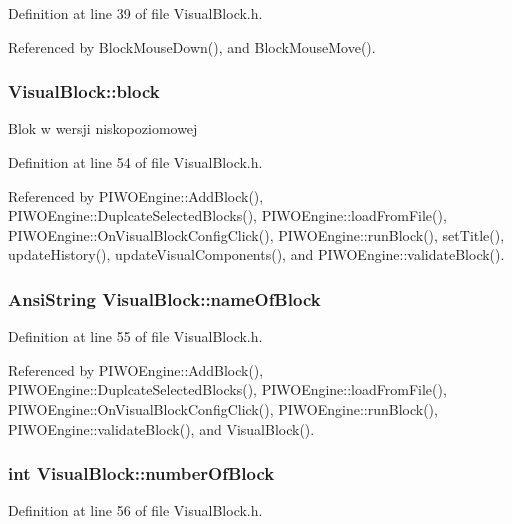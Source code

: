 Definition at line 39 of file VisualBlock.h.

Referenced by BlockMouseDown(), and BlockMouseMove().\hypertarget{classVisualBlock_76bfcfa68286004c352c4736635be0cb}{
\subsubsection[block]{ {\bf VisualBlock::block}}}
\label{classVisualBlock_76bfcfa68286004c352c4736635be0cb}


Blok w wersji niskopoziomowej 

Definition at line 54 of file VisualBlock.h.

Referenced by PIWOEngine::AddBlock(), PIWOEngine::DuplcateSelectedBlocks(), PIWOEngine::loadFromFile(), PIWOEngine::OnVisualBlockConfigClick(), PIWOEngine::runBlock(), setTitle(), updateHistory(), updateVisualComponents(), and PIWOEngine::validateBlock().\hypertarget{classVisualBlock_08efb43e1546631cb54848002d809a23}{
\subsubsection[nameOfBlock]{\setlength{\rightskip}{0pt plus 5cm}AnsiString {\bf VisualBlock::nameOfBlock}}}
\label{classVisualBlock_08efb43e1546631cb54848002d809a23}




Definition at line 55 of file VisualBlock.h.

Referenced by PIWOEngine::AddBlock(), PIWOEngine::DuplcateSelectedBlocks(), PIWOEngine::loadFromFile(), PIWOEngine::OnVisualBlockConfigClick(), PIWOEngine::runBlock(), PIWOEngine::validateBlock(), and VisualBlock().\hypertarget{classVisualBlock_726797ae619bdd874806321c7b878607}{
\subsubsection[numberOfBlock]{\setlength{\rightskip}{0pt plus 5cm}int {\bf VisualBlock::numberOfBlock}}}
\label{classVisualBlock_726797ae619bdd874806321c7b878607}




Definition at line 56 of file VisualBlock.h.

